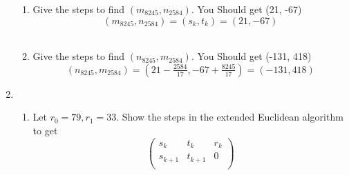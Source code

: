 \documentclass[11pt]{article}
\begin{document}
\begin{enumerate}
\begin{enumerate}
\item Give the steps to find $(m_{8245}, n_{2584})$.  You Should get (21, -67)
\\
$$(m_{8245}, n_{2584})  = (s_k, t_k) = (21, -67)$$
\\
\item Give the steps to find $(n_{8245}, m_{2584})$.  You Should get (-131, 418)
\\
$$(n_{8245}, m_{2584}) = (21 - \tfrac{2584}{17}, -67 + \tfrac{8245}{17}) = (-131, 418)$$
\end{enumerate}


\newpage %
\item 
\begin{enumerate}
\item Let $r_0 = 79, r_1 = 33$.  Show the steps in the extended Euclidean algorithm to get
\begin{equation*}
\left(
\begin{array}{ccc}
s_k & t_k & r_k \\
s_{k+1} & t_{k+1} & 0 \\
\end{array} \right)
\end{equation*}


\end{enumerate}
\end{enumerate}
\end{document}
